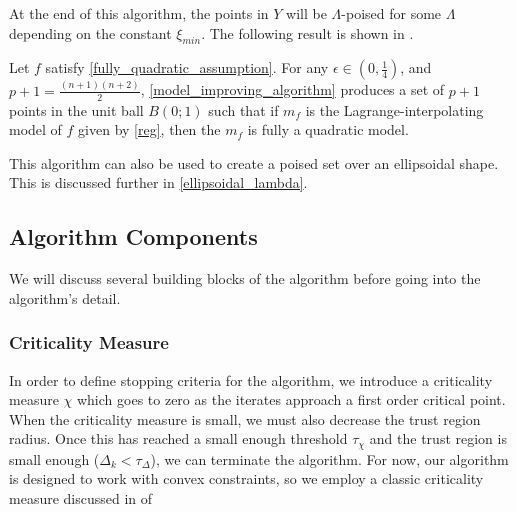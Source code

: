 At the end of this algorithm, the points in $Y$ will be $\Lambda$-poised for some $\Lambda$ depending on the constant $\xi_{min}$.
The following result is shown in \cite{DUMMY:intro_book}.
\begin{theorem}
\label{set_is_fully_quadratic}
Let $f$ satisfy \cref{fully_quadratic_assumption}.
For any $\epsilon \in (0, \frac 1 4)$, and $p+1 = \frac {(n+1)(n+2)}{2}$, \cref{model_improving_algorithm} produces a set of $p+1$ points in the unit ball $B(0; 1)$ such that if $m_f$ is the Lagrange-interpolating model of $f$ given by \cref{reg}, then the $m_f$ is fully a quadratic model.
\end{theorem}

This algorithm can also be used to create a poised set over an ellipsoidal shape. This is discussed further in \cref{ellipsoidal_lambda}.
% 
% 
% 


\subsection{Algorithm Components}

We will discuss several building blocks of the algorithm before going into the algorithm's detail.

\subsubsection{Criticality Measure}

In order to define stopping criteria for the algorithm, we introduce a criticality measure $\chi$ which goes to zero as the iterates approach a first order critical point.
When the criticality measure is small, we must also decrease the trust region radius.
Once this has reached a small enough threshold $\tau_{\chi}$ and the trust region is small enough ($\Delta_k < \tau_{\Delta}$), we can terminate the algorithm.
For now, our algorithm is designed to work with convex constraints, so we employ a classic criticality measure discussed in \cite{ConnGoulToin00} of

